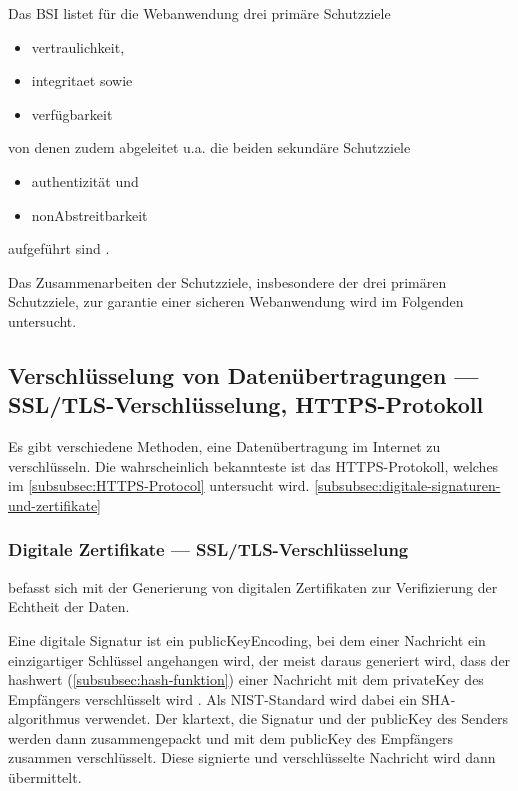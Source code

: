 Das \ac{BSI} listet für die Webanwendung drei primäre Schutzziele
\begin{samepage}
\begin{itemize}
    \item \gls{vertraulichkeit},
    \item \gls{integritaet} sowie
    \item \gls{verfügbarkeit}
\end{itemize}
\end{samepage}
von denen zudem abgeleitet u.a. die beiden sekundäre Schutzziele
\begin{samepage}
    \begin{itemize}
        \item \gls{authentizität} und 
        \item \gls{nonAbstreitbarkeit}
    \end{itemize}
\end{samepage}
aufgeführt sind \autocite[\pagef~8]{bsi_leitfaden_2022}. 

Das Zusammenarbeiten der Schutzziele, insbesondere der drei primären Schutzziele, zur garantie einer sicheren Webanwendung wird im Folgenden untersucht.

\subsection[Verschlüsselung von Datenübertragungen]{Verschlüsselung von Datenübertragungen — \ac{SSL}/\ac{TLS}-Verschlüsselung, \ac{HTTPS}-Protokoll}

Es gibt verschiedene Methoden, eine Datenübertragung im Internet zu verschlüsseln. Die wahrscheinlich bekannteste ist das \ac{HTTPS}-Protokoll, welches im \autoref{subsubsec:HTTPS-Protocol} untersucht wird. \autoref{subsubsec:digitale-signaturen-und-zertifikate}

\subsubsection[Digitale Zertifikate]{Digitale Zertifikate — \ac{SSL}/\ac{TLS}-Verschlüsselung}\label{subsubsec:digitale-signaturen-und-zertifikate} befasst sich mit der Generierung von digitalen Zertifikaten zur Verifizierung der Echtheit der Daten.

Eine digitale Signatur ist ein \gls{publicKeyEncoding}, bei dem einer Nachricht ein einzigartiger Schlüssel angehangen wird, der meist daraus generiert wird, dass der \gls{hashwert} (\autoref{subsubsec:hash-funktion}) einer Nachricht mit dem \gls{privateKey} des Empfängers verschlüsselt wird \autocite[\pagef~297]{6391693}. Als \ac{NIST}-Standard wird dabei ein \ac{SHA}-\gls{algorithmus} verwendet.
Der \gls{klartext}, die Signatur und der \gls{publicKey} des Senders werden dann zusammengepackt und mit dem \gls{publicKey} des Empfängers zusammen verschlüsselt. Diese signierte und verschlüsselte Nachricht wird dann übermittelt. \autocite[\pagef~297]{6391693}

